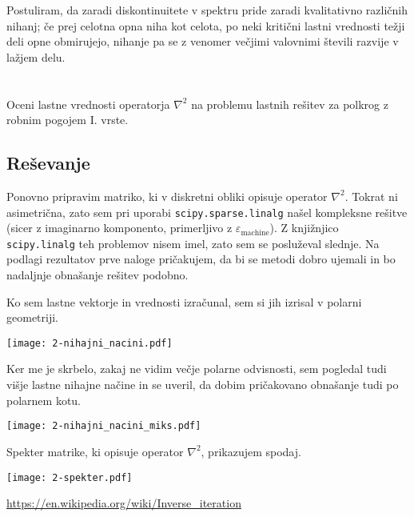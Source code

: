 \documentclass[a4paper,oneside,12pt]{article}
\begin{document}
Postuliram, da zaradi diskontinuitete v spektru pride zaradi kvalitativno različnih nihanj; če prej celotna opna niha kot celota, po neki kritični lastni vrednosti težji deli opne obmirujejo, nihanje pa se z venomer večjimi valovnimi števili razvije v lažjem delu.


\section{}
Oceni lastne vrednosti operatorja $\nabla^{2}$ na problemu lastnih rešitev za polkrog z robnim pogojem
I. vrste.

\subsection{Reševanje}

Ponovno pripravim matriko, ki v diskretni obliki opisuje operator $\nabla^2$. Tokrat ni asimetrična, zato sem pri uporabi \texttt{scipy.sparse.linalg} našel kompleksne rešitve (sicer z imaginarno komponento, primerljivo z $\varepsilon_\text{machine}$). Z knjižnjico \texttt{scipy.linalg} teh problemov nisem imel, zato sem se posluževal slednje. Na podlagi rezultatov prve naloge pričakujem, da bi se metodi dobro ujemali in bo nadaljnje obnašanje rešitev podobno.

Ko sem lastne vektorje in vrednosti izračunal, sem si jih izrisal v polarni geometriji.

\begin{center}
    \texttt{[image: 2-nihajni\_nacini.pdf]}
\end{center}
Ker me je skrbelo, zakaj  ne vidim večje polarne odvisnosti, sem pogledal tudi višje lastne nihajne načine in se uveril, da dobim pričakovano obnašanje tudi po polarnem kotu.



\begin{center}
    \texttt{[image: 2-nihajni\_nacini\_miks.pdf]}
\end{center}
Spekter matrike, ki opisuje operator $\nabla^2$, prikazujem spodaj.
\begin{center}
\texttt{[image: 2-spekter.pdf]}
\end{center}


\begin{thebibliography}{9}
 \url{https://en.wikipedia.org/wiki/Inverse_iteration}

\end{thebibliography}
\end{document}
